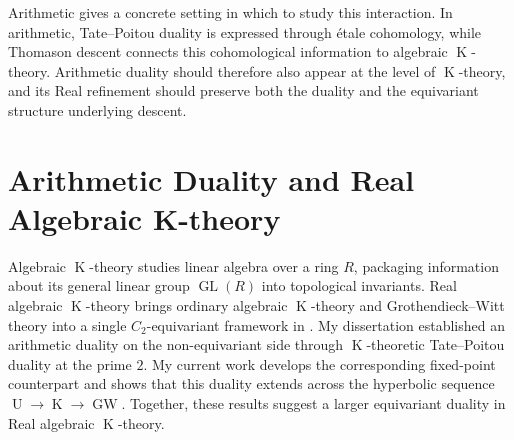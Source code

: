 \documentclass[11pt]{article}
\newcommand{\K}{\operatorname{K}}
\newcommand{\GW}{\operatorname{GW}}
\begin{document}
Arithmetic gives a concrete setting in which to study this interaction.
In arithmetic, Tate--Poitou duality is expressed through étale cohomology, while Thomason descent connects this cohomological information to algebraic $\K$-theory.
Arithmetic duality should therefore also appear at the level of $\K$-theory, and its Real refinement should preserve both the duality and the equivariant structure underlying descent.


\section{Arithmetic Duality and Real Algebraic K-theory}
Algebraic $\K$-theory studies linear algebra over a ring $R$, packaging information about its general linear group $\operatorname{GL}(R)$ into topological invariants.
Real algebraic $\K$-theory brings ordinary algebraic $\K$-theory and Grothendieck--Witt theory into a single $C_2$-equivariant framework in \cite{HMreal}.
My dissertation established an arithmetic duality on the non-equivariant side through $\K$-theoretic Tate--Poitou duality at the prime $2$.
My current work develops the corresponding fixed-point counterpart and shows that this duality extends across the hyperbolic sequence $\operatorname{U}\to\K\to\GW$.
Together, these results suggest a larger equivariant duality in Real algebraic $\K$-theory.
\end{document}
